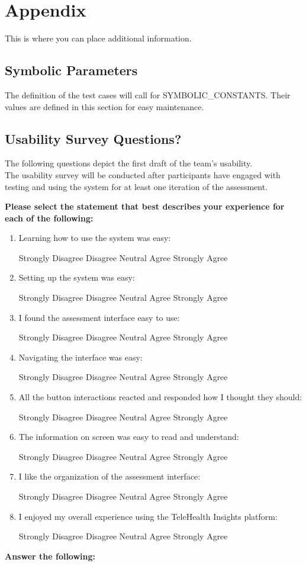 \documentclass[12pt, titlepage]{article}
\begin{document}
				




\newpage

\section{Appendix}

This is where you can place additional information.

\subsection{Symbolic Parameters}

The definition of the test cases will call for SYMBOLIC\_CONSTANTS.
Their values are defined in this section for easy maintenance.

\subsection{Usability Survey Questions?}
The following questions depict the first draft of the team's usability.\\
The usability survey will be conducted after participants have engaged with testing and using the system for at least one iteration of the assessment.\\

\newcommand{\likertScale}{
    \begin{center}
        Strongly Disagree \hfill Disagree \hfill Neutral \hfill Agree \hfill Strongly Agree
    \end{center}
}

\newcommand{\insertAnswerHere}{
  \begin{tcolorbox}[width=0.5\textwidth,
    colframe=black,
    colback=white,
    boxrule=0.1mm,
    sharp corners]
  \textit{Insert answer here...}
  \end{tcolorbox}
}

\textbf{Please select the statement that best describes your experience for each of the following:}
\begin{enumerate}
  \item Learning how to use the system was easy:\likertScale
  \item Setting up the system was easy:\likertScale
  \item I found the assessment interface easy to use:\likertScale
  \item Navigating the interface was easy:\likertScale
  \item All the button interactions reacted and responded how I thought they should:\likertScale
  \item The information on screen was easy to read and understand:\likertScale
  \item I like the organization of the assessment interface:\likertScale
  \item I enjoyed my overall experience using the TeleHealth Insights platform:\likertScale
\end{enumerate}
\textbf{Answer the following:}
\end{document}
